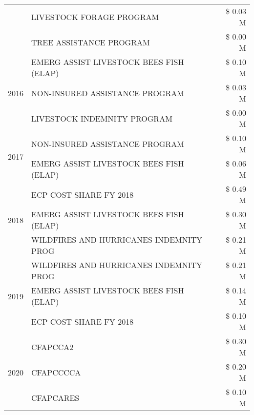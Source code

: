 \begin{tabular}{llr}
 & LIVESTOCK FORAGE PROGRAM & \$ 0.03 M \\
 & TREE ASSISTANCE PROGRAM & \$ 0.00 M \\
\cline{1-3}
\multirow[t]{3}{*}{2016} & EMERG ASSIST LIVESTOCK BEES FISH (ELAP)       & \$ 0.10 M \\
 & NON-INSURED ASSISTANCE PROGRAM                & \$ 0.03 M \\
 & LIVESTOCK INDEMNITY PROGRAM                   & \$ 0.00 M \\
\cline{1-3}
\multirow[t]{2}{*}{2017} & NON-INSURED ASSISTANCE PROGRAM & \$ 0.10 M \\
 & EMERG ASSIST LIVESTOCK BEES FISH (ELAP) & \$ 0.06 M \\
\cline{1-3}
\multirow[t]{3}{*}{2018} & ECP COST SHARE FY 2018 & \$ 0.49 M \\
 & EMERG ASSIST LIVESTOCK BEES FISH (ELAP) & \$ 0.30 M \\
 & WILDFIRES AND HURRICANES INDEMNITY PROG & \$ 0.21 M \\
\cline{1-3}
\multirow[t]{3}{*}{2019} & WILDFIRES AND HURRICANES INDEMNITY PROG & \$ 0.21 M \\
 & EMERG ASSIST LIVESTOCK BEES FISH (ELAP) & \$ 0.14 M \\
 & ECP COST SHARE FY 2018 & \$ 0.10 M \\
\cline{1-3}
\multirow[t]{3}{*}{2020} & CFAPCCA2 & \$ 0.30 M \\
 & CFAPCCCCA & \$ 0.20 M \\
 & CFAPCARES & \$ 0.10 M \\
\cline{1-3}
\bottomrule
\end{tabular}
